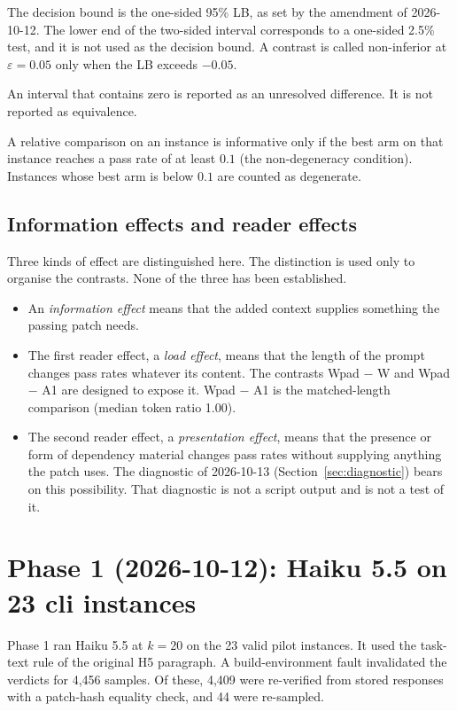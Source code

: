 \documentclass[11pt,a4paper]{article}
\newcommand{\eps}{\varepsilon}
\begin{document}
The decision bound is the one-sided 95\% LB, as set by the amendment of 2026-10-12. The lower end of the two-sided interval corresponds to a one-sided 2.5\% test, and it is not used as the decision bound. A contrast is called non-inferior at $\eps = 0.05$ only when the LB exceeds $-0.05$.

An interval that contains zero is reported as an unresolved difference. It is not reported as equivalence.

A relative comparison on an instance is informative only if the best arm on that instance reaches a pass rate of at least $0.1$ (the non-degeneracy condition). Instances whose best arm is below $0.1$ are counted as degenerate.

\subsection{Information effects and reader effects}

Three kinds of effect are distinguished here. The distinction is used only to organise the contrasts. None of the three has been established.

\begin{itemize}
\item An \emph{information effect} means that the added context supplies something the passing patch needs.
\item The first reader effect, a \emph{load effect}, means that the length of the prompt changes pass rates whatever its content. The contrasts Wpad $-$ W and Wpad $-$ A1 are designed to expose it. Wpad $-$ A1 is the matched-length comparison (median token ratio 1.00).
\item The second reader effect, a \emph{presentation effect}, means that the presence or form of dependency material changes pass rates without supplying anything the patch uses. The diagnostic of 2026-10-13 (Section~\ref{sec:diagnostic}) bears on this possibility. That diagnostic is not a script output and is not a test of it.
\end{itemize}

\section{Phase 1 (2026-10-12): Haiku 5.5 on 23 cli instances}

Phase 1 ran Haiku 5.5 at $k=20$ on the 23 valid pilot instances. It used the task-text rule of the original H5 paragraph. A build-environment fault invalidated the verdicts for 4,456 samples. Of these, 4,409 were re-verified from stored responses with a patch-hash equality check, and 44 were re-sampled.
\end{document}
